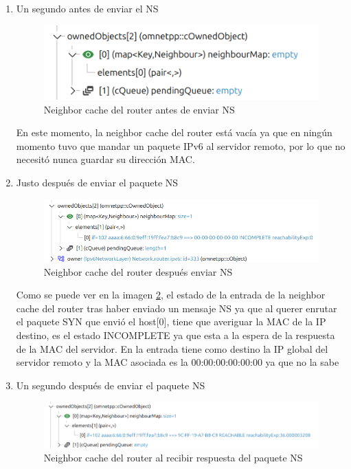 \begin{enumerate}
    \item Un segundo antes de enviar el NS
    
    \begin{figure}[H]
        \centering
        \includegraphics[width=135mm, scale=0.75]{imaxes/captura_ejer4_33.png}
        \caption{Neighbor cache del router antes de enviar NS}
        \label{fig:paquete_ns_t6}
    \end{figure}

    En este momento, la neighbor cache del router está vacía ya que en ningún momento tuvo que mandar un paquete IPv6 al servidor remoto, por lo que no necesitó nunca guardar su dirección MAC.

    \item Justo después de enviar el paquete NS
    
    \begin{figure}[H]
        \centering
        \includegraphics[width=135mm, scale=0.75]{imaxes/captura_ejer4_31.png}
        \caption{Neighbor cache del router después enviar NS}
        \label{fig:paquete_ns_t6}
    \end{figure}

   Como se puede ver en la imagen \ref{fig:paquete_ns_t6}, el estado de la entrada de la neighbor cache del router tras haber enviado un mensaje NS ya que al querer enrutar el paquete SYN que envió el host[0], tiene que averiguar la MAC de la IP destino, es el estado INCOMPLETE ya que esta a la espera de la respuesta de la MAC del servidor. En la entrada tiene como destino la IP global del servidor remoto y la MAC asociada es la 00:00:00:00:00:00 ya que no la sabe

    \item Un segundo después de enviar el paquete NS
    \begin{figure}[H]
        \centering
        \includegraphics[width=135mm, scale=0.75]{imaxes/captura_ejer4_32.png}
        \caption{Neighbor cache del router al recibir respuesta del paquete NS}
        \label{fig:respuesta_ns_t6}
    \end{figure}


\end{enumerate}
